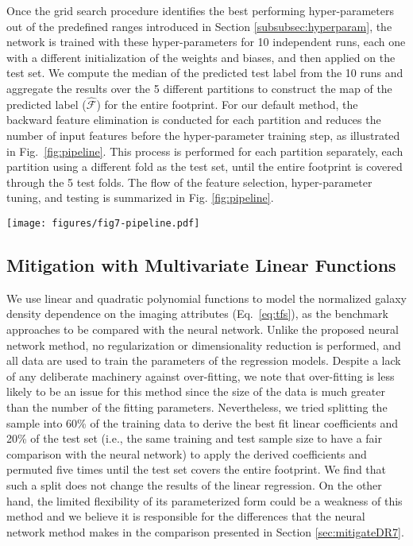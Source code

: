 Once the grid search procedure identifies the best performing hyper-parameters out of the predefined ranges introduced in Section \ref{subsubsec:hyperparam}, the network is trained with these hyper-parameters for 10 independent runs, each one with a different initialization of the weights and biases, and then applied on the test set. We compute the median of the predicted test label from the 10 runs and aggregate the results over the 5 different partitions to construct the map of the predicted label ($\hat{\mathcal{F}}$) for the entire footprint. For our default method, the backward feature elimination is conducted for each partition and reduces the number of input features before the hyper-parameter training step, as illustrated in Fig.~\ref{fig:pipeline}.  This process is performed for each partition separately, each partition using a different fold as the test set, until the entire footprint is covered through the 5 test folds. The flow of the feature selection, hyper-parameter tuning, and testing is summarized in Fig. \ref{fig:pipeline}.\\

\begin{figure*}
         \centering
         \texttt{[image: figures/fig7-pipeline.pdf]}
         \caption{A flow-chart of the backward feature elimination and hyper-parameter tuning for each partition. This entire process is performed five times for each of the five partitions/permutations such that the entire footprint is covered by aggregating the different testing folds. }
         \label{fig:pipeline}
\end{figure*}

\subsection{Mitigation with Multivariate Linear Functions}
We use linear and quadratic polynomial functions to model the normalized galaxy density dependence on the imaging attributes (Eq.~\ref{eq:tfs}), as the benchmark approaches to be compared with the neural network. Unlike the proposed neural network method, no regularization or dimensionality reduction is performed, and all data are used to train the parameters of the regression models. Despite a lack of any deliberate machinery against over-fitting, we note that over-fitting is less likely to be an issue for this method since the size of the data is much greater than the number of the fitting parameters. Nevertheless, we tried splitting the sample into 60\% of the training data to derive the best fit linear coefficients and 20\% of the test set (i.e., the same training and test sample size to have a fair comparison with the neural network) to apply the derived coefficients and permuted five times until the test set covers the entire footprint. We find that such a split does not change the results of the linear regression. On the other hand, the limited flexibility of its parameterized form could be a weakness of this method and we believe it is responsible for the differences that the neural network method makes in the comparison presented in Section \ref{sec:mitigateDR7}.\\

